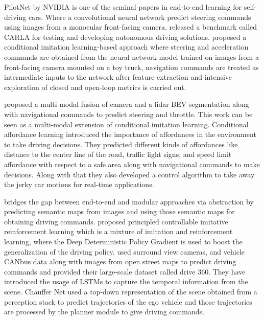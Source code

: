 \cite{DBLP:journals/corr/BojarskiTDFFGJM16} PilotNet by NVIDIA is one of the seminal papers in end-to-end learning for self-driving cars. Where a convolutional neural network predict steering commands using images from a monocular front-facing camera. \cite{DBLP:journals/corr/abs-1711-03938} released a benchmark called CARLA for testing and developing autonomous driving solutions. \cite{DBLP:journals/corr/abs-1710-02410} proposed a conditional imitation learning-based approach where steering and acceleration commands are obtained from the neural network model trained on images from a front-facing camera mounted on a toy truck, navigation commands are treated as intermediate inputs to the network after feature extraction and intensive exploration of closed and open-loop metrics is carried out.

\cite{Sobh2018EndToEndMS} proposed a multi-modal fusion of camera and a lidar BEV segmentation along with navigational commands to predict steering and throttle. This work can be seen as a multi-modal extension of conditional imitation learning. Conditional affordance learning \cite{DBLP:journals/corr/abs-1806-06498} introduced the importance of affordances in the environment to take driving decisions. They predicted different kinds of affordances like distance to the center line of the road, traffic light signs, and speed limit affordance with respect to a safe area along with navigational commands to make decisions. Along with that they also developed a control algorithm to take away the jerky car motions for real-time applications.  


\cite{DBLP:journals/corr/abs-1804-09364} bridges the gap between end-to-end and modular approaches via abstraction by predicting semantic maps from images and using those semantic maps for obtaining driving commands. \cite{DBLP:journals/corr/abs-1807-03776} proposed principled controllable imitative reinforcement learning which is a mixture of imitation and reinforcement learning, where the Deep Deterministic Policy Gradient is used to boost the generalization of the driving policy. \cite{DBLP:journals/corr/abs-1803-10158} used surround view cameras, and vehicle CANbus data along with images from open street maps to predict driving commands and provided their large-scale dataset called drive 360. They have introduced the usage of LSTMs to capture the temporal information from the scene. Chauffer Net \cite{DBLP:journals/corr/abs-1812-03079} used a top-down representation of the scene obtained from a perception stack to predict trajectories of the ego vehicle and those trajectories are processed by the planner module to give driving commands. 

